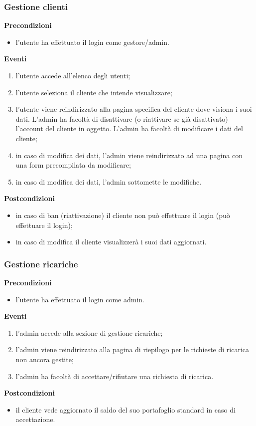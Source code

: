 \documentclass[a4paper, 14pt]{article}
\begin{document}
\begin{flushleft}
			\bigskip
			\subsubsection{Gestione clienti}
			\textbf{Precondizioni}
			\begin{itemize}
				\item l'utente ha effettuato il login come gestore/admin.
			\end{itemize}
			\textbf{Eventi}
			\begin{enumerate}
				\item l'utente accede all'elenco degli utenti;
				\item l'utente seleziona il cliente che intende visualizzare;
				\item l'utente viene reindirizzato alla pagina specifica del cliente dove visiona i suoi dati.
					  L'admin ha facoltà di disattivare (o riattivare se già disattivato) l'account del cliente in oggetto.
					  L'admin ha facoltà di modificare i dati del cliente;
				\item in caso di modifica dei dati, l'admin viene reindirizzato ad una pagina con una form precompilata
					  da modificare;
				\item in caso di modifica dei dati, l'admin sottomette le modifiche.
			\end{enumerate}
			\textbf{Postcondizioni}
			\begin{itemize}
				\item in caso di ban (riattivazione) il cliente non può effettuare il login (può effettuare il login);
				\item in caso di modifica il cliente visualizzerà i suoi dati aggiornati.
			\end{itemize}
			
			\bigskip
			
			\subsubsection{Gestione ricariche}
			\textbf{Precondizioni}
			\begin{itemize}
				\item l'utente ha effettuato il login come admin.
			\end{itemize}
			\textbf{Eventi}
			\begin{enumerate}
				\item l'admin accede alla sezione di gestione ricariche;
				\item l'admin viene reindirizzato alla pagina di riepilogo per le richieste di ricarica non ancora gestite;
				\item l'admin ha facoltà di accettare/rifiutare una richiesta di ricarica.
			\end{enumerate}
			\textbf{Postcondizioni}
			\begin{itemize}
				\item il cliente vede aggiornato il saldo del suo portafoglio standard in caso di accettazione.
			\end{itemize}
			

\end{flushleft}
\end{document}
